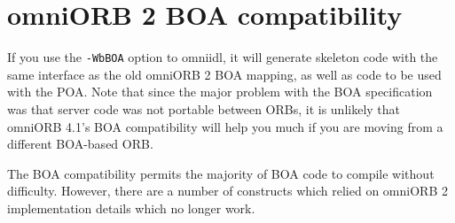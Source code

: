 \documentclass[11pt,twoside,a4paper]{book}
\newcommand{\cmdline}[1]{\texttt{#1}}
\begin{document}
\section{omniORB 2 BOA compatibility}
\label{sec:BOAcompat}

If you use the \cmdline{-WbBOA} option to omniidl, it will generate
skeleton code with the same interface as the old omniORB 2 BOA
mapping, as well as code to be used with the POA. Note that since the
major problem with the BOA specification was that server code was not
portable between ORBs, it is unlikely that omniORB 4.1's BOA
compatibility will help you much if you are moving from a different
BOA-based ORB.

The BOA compatibility permits the majority of BOA code to compile
without difficulty. However, there are a number of constructs which
relied on omniORB 2 implementation details which no longer work.
\end{document}
